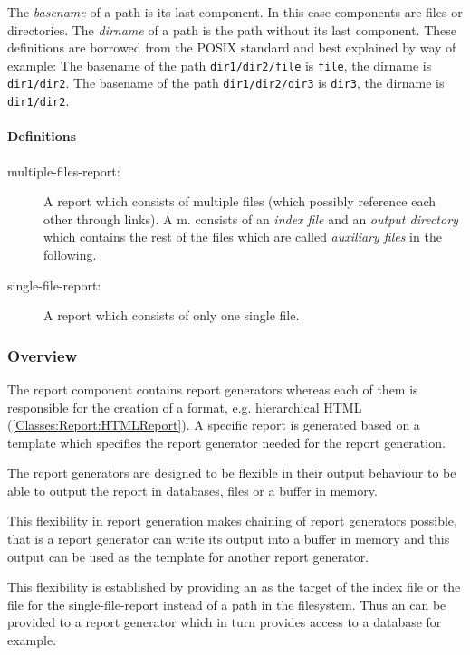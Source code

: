 The \emph{basename} of a path is its last component. In this case components are files or directories. The \emph{dirname} of a path is the path without its last component. These definitions are borrowed from the POSIX standard and best explained by way of example: The basename of the path \texttt{dir1/dir2/file} is \texttt{file}, the dirname is \texttt{dir1/dir2}. The basename of the path \texttt{dir1/dir2/dir3} is \texttt{dir3}, the dirname is \texttt{dir1/dir2}.


\paragraph{Definitions}

\begin{description}
\item[multiple-files-report:] A report which consists of multiple files (which possibly reference each other through links). A m. consists of an \emph{index file} and an \emph{output directory} which contains the rest of the files which are called \emph{auxiliary files} in the following.

\item[single-file-report:] A report which consists of only one single file.
\end{description}


\subsubsection{Overview}

The report component contains report generators whereas each of them is responsible for the creation of a format, e.g. hierarchical HTML (\ref{Classes:Report:HTMLReport}). A specific report is generated based on a template which specifies the report generator needed for the report generation. 

The report generators are designed to be flexible in their output behaviour to be able to output the report in databases, files or a buffer in memory. 

This flexibility in report generation makes chaining of report generators possible, that is a report generator can write its output into a buffer in memory and this output can be used as the template for another report generator.

This flexibility is established by providing an  as the target of the index file or the file for the single-file-report instead of a path in the filesystem. Thus an  can be provided to a report generator which in turn provides access to a database for example.

